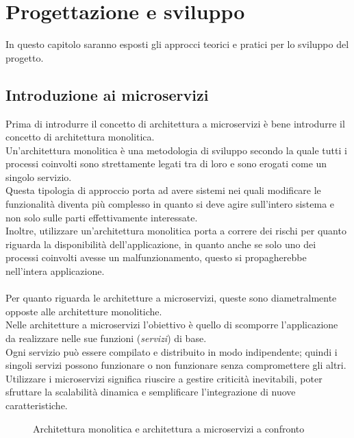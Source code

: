 \chapter{Progettazione e sviluppo}\label{chapter:progettazionesviluppo}
In questo capitolo saranno esposti gli approcci teorici e pratici per lo sviluppo del progetto.


\section{Introduzione ai microservizi}\label{sec:microserviziintro}
Prima di introdurre il concetto di architettura a microservizi è bene introdurre il concetto di architettura monolitica.\\
Un'architettura monolitica è una metodologia di sviluppo secondo la quale tutti i processi coinvolti sono strettamente legati tra di loro e sono erogati come un singolo servizio.\\
Questa tipologia di approccio porta ad avere sistemi nei quali modificare le funzionalità diventa più complesso in quanto si deve agire sull'intero sistema e non solo sulle parti effettivamente interessate.\\
Inoltre, utilizzare un'architettura monolitica porta a correre dei rischi per quanto riguarda la disponibilità dell'applicazione, in quanto anche se solo uno dei processi coinvolti avesse un malfunzionamento, questo si propagherebbe nell'intera applicazione.\\ \\
Per quanto riguarda le architetture a microservizi, queste sono diametralmente opposte alle architetture monolitiche.\\
Nelle architetture a microservizi l'obiettivo è quello di scomporre l'applicazione da realizzare nelle sue funzioni (\emph{servizi}) di base.\\
Ogni servizio può essere compilato e distribuito in modo indipendente; quindi i singoli servizi possono funzionare o non funzionare senza compromettere gli altri.\\
Utilizzare i microservizi significa riuscire a gestire criticità inevitabili, poter sfruttare la scalabilità dinamica e semplificare l'integrazione di nuove caratteristiche.\\

\begin{figure}[ht]
	\centering
	\caption{Architettura monolitica e architettura a microservizi a confronto}
	\label{fig:one}
\end{figure}

